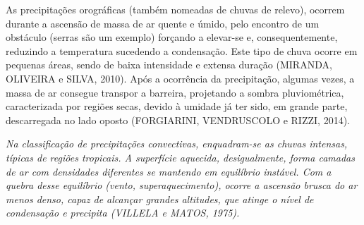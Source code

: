 As precipitações orográficas (também nomeadas de chuvas de relevo), ocorrem durante a ascensão de massa de ar quente e úmido, pelo encontro de um obstáculo (serras são um exemplo) forçando a elevar-se e, consequentemente, reduzindo a temperatura sucedendo a condensação. Este tipo de chuva ocorre em pequenas áreas, sendo de baixa intensidade e extensa duração (MIRANDA, OLIVEIRA e SILVA, 2010). Após a ocorrência da precipitação, algumas vezes, a massa de ar consegue transpor a barreira, projetando a sombra pluviométrica, caracterizada por regiões secas, devido à umidade já ter sido, em grande parte, descarregada no lado oposto (FORGIARINI, VENDRUSCOLO e RIZZI, 2014).

\textit{Na classificação de precipitações convectivas, enquadram-se as chuvas intensas, típicas de regiões tropicais. A superfície aquecida, desigualmente, forma camadas de ar com densidades diferentes se mantendo em equilíbrio instável. Com a quebra desse equilíbrio (vento, superaquecimento), ocorre a ascensão brusca do ar menos denso, capaz de alcançar grandes altitudes, que atinge o nível de condensação e precipita (VILLELA e MATOS, 1975).}